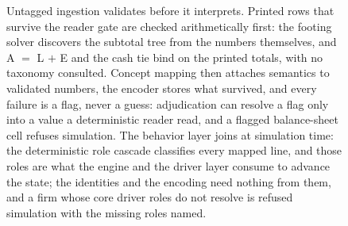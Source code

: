 \documentclass[11pt]{article}
\begin{document}
\begin{figure}[h]
\caption{Untagged ingestion validates before it interprets. Printed rows that survive the reader gate are checked arithmetically first: the footing solver discovers the subtotal tree from the numbers themselves, and A $=$ L $+$ E and the cash tie bind on the printed totals, with no taxonomy consulted. Concept mapping then attaches semantics to validated numbers, the encoder stores what survived, and every failure is a flag, never a guess: adjudication can resolve a flag only into a value a deterministic reader read, and a flagged balance-sheet cell refuses simulation. The behavior layer joins at simulation time: the deterministic role cascade classifies every mapped line, and those roles are what the engine and the driver layer consume to advance the state; the identities and the encoding need nothing from them, and a firm whose core driver roles do not resolve is refused simulation with the missing roles named.}
\label{fig:untagged}
\end{figure}
\end{document}
